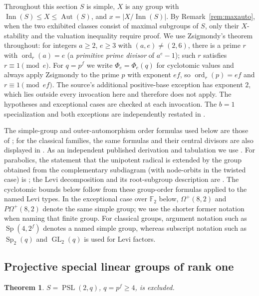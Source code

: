 \documentclass[11pt]{amsart}
\newtheorem{theorem}{Theorem}[section]
\theoremstyle{definition}
\theoremstyle{remark}
\DeclareMathOperator{\Inn}{Inn}
\DeclareMathOperator{\Aut}{Aut}
\DeclareMathOperator{\PSL}{PSL}
\DeclareMathOperator{\Sp}{Sp}
\DeclareMathOperator{\GL}{GL}
\DeclareMathOperator{\ord}{ord}
\newcommand{\F}{\mathbb{F}}
\begin{document}
Throughout this section $S$ is simple, $X$ is any group with
$\Inn(S)\leq X\leq\Aut(S)$, and $x=|X/\Inn(S)|$. By
Remark~\ref{rem:maxauto}, when the two exhibited classes consist of
maximal subgroups of $S$, only their $X$-stability and the valuation
inequality require proof. We use Zsigmondy's theorem
\cite[specialized theorem, p.~283]{Zsigmondy}
throughout: for integers $a\geq2$, $e\geq3$ with $(a,e)\neq(2,6)$, there
is a prime $r$ with $\ord_r(a)=e$ (a \emph{primitive prime divisor} of
$a^e-1$); such $r$ satisfies $r\equiv1\pmod e$. For $q=p^f$ we write
$\Phi_e=\Phi_e(q)$ for cyclotomic values and always apply Zsigmondy to
the prime $p$ with exponent $ef$, so $\ord_r(p)=ef$ and
$r\equiv1\pmod{ef}$. The source's additional positive-base exception has
exponent $2$, which lies outside every invocation here and therefore does not
apply. The hypotheses and exceptional cases are checked at each invocation.
The $b=1$ specialization and both exceptions are independently restated in
\cite[Thm.~2.2, p.~2]{Jones2007}.

The simple-group and outer-automorphism order formulas used below are
those of \cite[Tables~5--6, p.~xvi]{ATLAS}; for the classical families,
the same formulas and their central divisors are also displayed in
\cite[\S\S2.1--2.4, pp.~x--xii]{ATLAS}. As an independent published
derivation and tabulation we use
\cite[\S10, pp.~220--221, and summary table, p.~239]{Carter1965}.
For parabolics, the statement that the unipotent radical is extended by
the group obtained from the complementary subdiagram (with node-orbits in
the twisted case) is \cite[\S3.6, p.~xv]{ATLAS}; the Levi decomposition
and its root-subgroup description are
\cite[\S8.5, pp.~118--120]{Carter}. The cyclotomic bounds below follow from
these group-order formulas applied to the named Levi types.
In the exceptional case over $\F_2$ below,
$\Omega^+(8,2)$ and $P\Omega^+(8,2)$ denote the same simple group; we use
the shorter former notation when naming that finite group. For classical
groups, argument notation such as $\Sp(4,2^f)$ denotes a named simple group,
whereas subscript notation such as $\Sp_2(q)$ and $\GL_2(q)$ is used for Levi
factors.

\subsection{Projective special linear groups of rank one}\label{app:psl2}

\begin{theorem}\label{thm:psl2}
$S=\PSL(2,q)$, $q=p^f\geq4$, is excluded.
\end{theorem}
\end{document}
